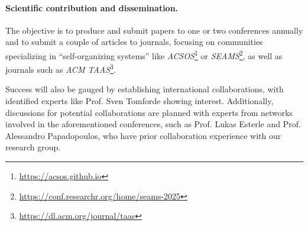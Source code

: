 \documentclass[12pt, a4paper]{article}
\begin{document}
\sloppypar
\paragraph{Scientific contribution and dissemination.}
The objective is to produce and submit papers to one or two conferences annually and to submit a couple of articles to journals,
focusing on communities specializing in ``self-organizing systems'' like \emph{ACSOS}\footnote{\url{https://acsos.github.io}} or \emph{SEAMS}\footnote{\url{https://conf.researchr.org/home/seams-2025}},
as well as journals such as \emph{ACM TAAS}\footnote{\url{https://dl.acm.org/journal/taas}}.

Success will also be gauged by establishing international collaborations, with identified experts like Prof. Sven Tomforde showing interest.
%
Additionally,
discussions for potential collaborations are planned with experts from networks involved in the aforementioned conferences,
such as Prof. Lukas Esterle and Prof. Alessandro Papadopoulos,
who have prior collaboration experience with our research group.



\end{document}
